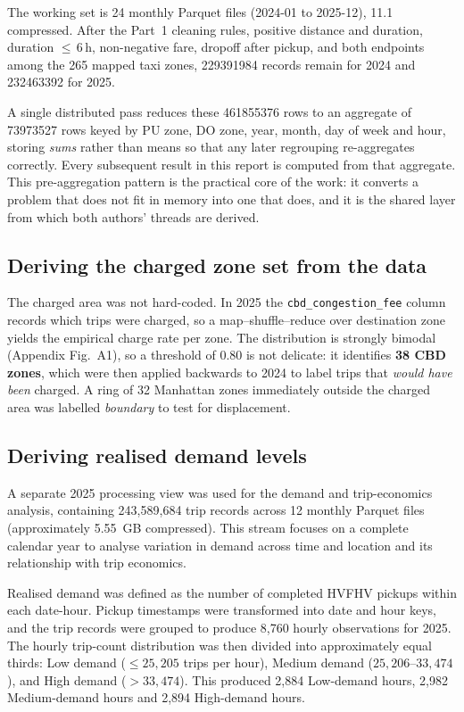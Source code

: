 \documentclass[10pt,a4paper]{article}
\begin{document}
The working set is 24 monthly Parquet files (2024-01 to 2025-12),
\SI{11.1}{\giga\byte} compressed. After the Part~1 cleaning rules, positive
distance and duration, duration $\leq$\,6\,h, non-negative fare, dropoff after
pickup, and both endpoints among the 265 mapped taxi zones, \num{229391984}
records remain for 2024 and \num{232463392} for 2025.

A single distributed pass reduces these \num{461855376} rows to an aggregate of
\num{73973527} rows keyed by PU zone, DO zone, year, month, day of week and hour,
storing \emph{sums} rather than means so that any later regrouping re-aggregates
correctly. Every subsequent result in this report is computed from that
aggregate. This pre-aggregation pattern is the practical core of the work: it
converts a problem that does not fit in memory into one that does, and it is the
shared layer from which both authors' threads are derived.

\subsection{Deriving the charged zone set from the data}

The charged area was not hard-coded. In 2025 the \texttt{cbd\_congestion\_fee}
column records which trips were charged, so a map--shuffle--reduce over
destination zone yields the empirical charge rate per zone. The distribution is
strongly bimodal (Appendix Fig.~A1), so a threshold of \num{0.80} is not
delicate: it identifies \textbf{38 CBD zones}, which were then applied backwards
to 2024 to label trips that \emph{would have been} charged. A ring of 32
Manhattan zones immediately outside the charged area was labelled
\emph{boundary} to test for displacement.

\subsection{Deriving realised demand levels}

A separate 2025 processing view was used for the demand and
trip-economics analysis, containing 243,589,684 trip records across
12 monthly Parquet files (approximately 5.55~GB compressed). This
stream focuses on a complete calendar year to analyse variation in
demand across time and location and its relationship with trip
economics.

Realised demand was defined as the number of completed HVFHV pickups
within each date-hour. Pickup timestamps were transformed into date
and hour keys, and the trip records were grouped to produce 8,760
hourly observations for 2025. The hourly trip-count distribution was
then divided into approximately equal thirds: Low demand
($\leq 25{,}205$ trips per hour), Medium demand
($25{,}206$--$33{,}474$), and High demand
($>33{,}474$). This produced 2,884 Low-demand hours, 2,982
Medium-demand hours and 2,894 High-demand hours.
\end{document}
